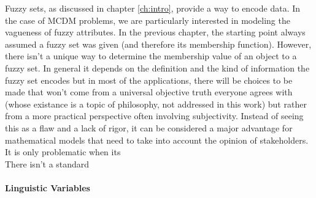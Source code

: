 
Fuzzy sets, as discussed in chapter \ref{ch:intro}, provide a way to encode data. In the case of MCDM  problems, we are particularly interested in modeling the vagueness of fuzzy attributes. In the previous chapter, the starting point always assumed a fuzzy set was given (and therefore its membership function). However, there isn't a unique way to determine the membership value of an object to a fuzzy set. In general it depends on the definition and the kind of information the fuzzy set encodes but in most of the applications, there will be choices to be made that won't come from a universal objective truth everyone agrees with (whose existance is a topic of philosophy, not addressed in this work) but rather from a more practical perspective often involving subjectivity. Instead of seeing this as a flaw and a lack of rigor, it can be considered a major advantage for mathematical models that need to take into account the opinion of stakeholders. It is only problematic when its  \\

There isn't a standard 

\paragraph{}

\paragraph{Linguistic Variables}